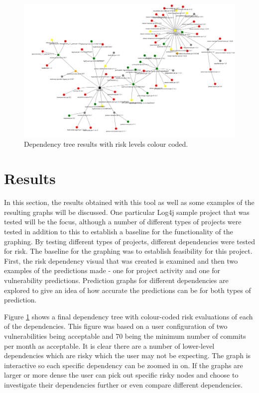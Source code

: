 \documentclass[conference]{IEEEtran}
\begin{document}
\begin{figure}
    \centering
    \includegraphics[scale=0.5]{dependency.png}
    \caption{Dependency tree results with risk levels colour coded.} 
    \label{fig:tree}
\end{figure}
\section{Results}

In this section, the results obtained with this tool as well as some examples of the resulting graphs will be discussed. One particular Log4j sample project \cite{noauthor_logging-log4j-sampleslog4j-server_nodate} that was tested will be the focus, although a number of different types of projects were tested in addition to this to establish a baseline for the functionality of the graphing. By testing different types of projects, different dependencies were tested for risk. The baseline for the graphing was to establish feasibility for this project. First, the risk dependency visual that was created is examined and then two examples of the predictions made - one for project activity and one for vulnerability predictions. Prediction graphs for different dependencies are explored to give an idea of how accurate the predictions can be for both types of prediction. 

Figure \ref{fig:tree} shows a final dependency tree with colour-coded risk evaluations of each of the dependencies. This figure was based on a user configuration of two vulnerabilities being acceptable and 70 being the minimum number of commits per month as acceptable. It is clear there are a number of lower-level dependencies which are risky which the user may not be expecting. The graph is interactive so each specific dependency can be zoomed in on. If the graphs are larger or more dense the user can pick out specific risky nodes and choose to investigate their dependencies further or even compare different dependencies. 
\end{document}
